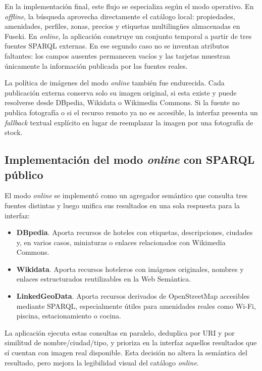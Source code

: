En la implementación final, este flujo se especializa según el modo operativo. En
\textit{offline}, la búsqueda aprovecha directamente el catálogo local: propiedades,
amenidades, perfiles, zonas, precios y etiquetas multilingües almacenadas en Fuseki. En
\textit{online}, la aplicación construye un conjunto temporal a partir de tres fuentes
SPARQL externas. En ese segundo caso no se inventan atributos faltantes: los campos
ausentes permanecen vacíos y las tarjetas muestran únicamente la información publicada
por las fuentes reales.

La política de imágenes del modo \textit{online} también fue endurecida. Cada
publicación externa conserva solo su imagen original, si esta existe y puede resolverse
desde DBpedia, Wikidata o Wikimedia Commons. Si la fuente no publica fotografía o si el
recurso remoto ya no es accesible, la interfaz presenta un \textit{fallback} textual
explícito en lugar de reemplazar la imagen por una fotografía de stock.

\subsection{Implementación del modo \textit{online} con SPARQL público}

El modo \textit{online} se implementó como un agregador semántico que consulta tres
fuentes distintas y luego unifica sus resultados en una sola respuesta para la interfaz:

\begin{itemize}
  \item \textbf{DBpedia}. Aporta recursos de hoteles con etiquetas, descripciones,
  ciudades y, en varios casos, miniaturas o enlaces relacionados con Wikimedia Commons.
  \item \textbf{Wikidata}. Aporta recursos hoteleros con imágenes originales, nombres y
  enlaces estructurados reutilizables en la Web Semántica.
  \item \textbf{LinkedGeoData}. Aporta recursos derivados de OpenStreetMap accesibles
  mediante SPARQL, especialmente útiles para amenidades reales como Wi-Fi, piscina,
  estacionamiento o cocina.
\end{itemize}

La aplicación ejecuta estas consultas en paralelo, deduplica por URI y por similitud de
nombre/ciudad/tipo, y prioriza en la interfaz aquellos resultados que sí cuentan con
imagen real disponible. Esta decisión no altera la semántica del resultado, pero mejora
la legibilidad visual del catálogo \textit{online}.

